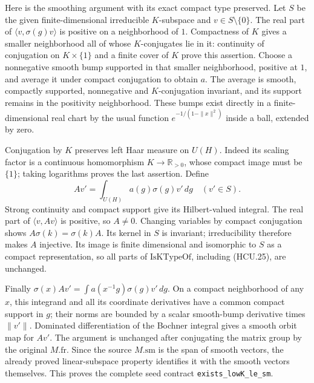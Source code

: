 Here is the smoothing argument with its exact compact type preserved.
Let \(S\) be the given finite-dimensional irreducible \(K\)-subspace
and \(v\in S\setminus\{0\}\).
The real part of \(\langle v,\sigma(g)v\rangle\) is positive on a
neighborhood of \(1\).  Compactness of \(K\) gives a smaller neighborhood
all of whose \(K\)-conjugates lie in it: continuity of conjugation on
\(K\times\{1\}\) and a finite cover of \(K\) prove this assertion.
Choose a nonnegative smooth bump supported in that smaller neighborhood,
positive at \(1\), and average it under compact conjugation to obtain
\(a\).  The average is smooth, compactly supported, nonnegative and
\(K\)-conjugation invariant, and its support remains in the positivity
neighborhood.  These bumps exist directly in a finite-dimensional
real chart by the usual function
\(e^{-1/(1-\|x\|^2)}\) inside a ball, extended by zero.

Conjugation by \(K\) preserves left Haar measure on \(U(H)\).
Indeed its scaling factor is a continuous homomorphism
\(K\to\mathbb R_{>0}\), whose compact image must be \(\{1\}\);
taking logarithms proves the last assertion.
Define
\[
 A v'=\int_{U(H)}a(g)\sigma(g)v'\,dg\quad(v'\in S).
 \tag{HCU.27}
\]
Strong continuity and compact support give its Hilbert-valued integral.
The real part of \(\langle v,Av\rangle\) is positive, so \(A\ne0\).
Changing variables by compact conjugation shows
\(A\sigma(k)=\sigma(k)A\).  Its kernel in \(S\) is invariant;
irreducibility therefore makes \(A\) injective.  Its image is finite
dimensional and isomorphic to \(S\) as a compact representation, so all
parts of \(\mathrm{IsKTypeOf}\), including (HCU.25), are unchanged.

Finally
\(\sigma(x)Av'=\int a(x^{-1}g)\sigma(g)v'\,dg\).
On a compact neighborhood of any \(x\), this integrand and all its
coordinate derivatives have a common compact support in \(g\);
their norms are bounded by a scalar smooth-bump derivative times
\(\|v'\|\).  Dominated differentiation of the Bochner integral gives
a smooth orbit map for \(Av'\).  The argument is unchanged after
conjugating the matrix group by the original \(M.\mathrm{fr}\).
Since the source \(M.\mathrm{sm}\) is the span of smooth vectors,
the already proved linear-subspace property identifies it with the
smooth vectors themselves.  This proves the complete seed contract
\texttt{exists\_lowK\_le\_sm}.

